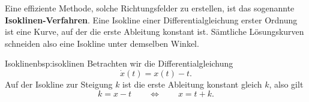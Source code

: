 Eine effiziente Methode, solche Richtungsfelder zu erstellen,
ist das sogenannte \textbf{Isoklinen-Verfahren}.
Eine Isokline einer Differentialgleichung erster Ordnung ist
eine Kurve, auf der die erste Ableitung konstant ist.
Sämtliche Lösungskurven schneiden also eine Isokline
unter demselben Winkel.

\begin{bsp}{Isoklinen}{bsp:isoklinen}
    Betrachten wir die Differentialgleichung
    \[
        \dot{x}(t)=x(t)-t.
    \]
    Auf der Isokline zur Steigung \(k\) ist die erste Ableitung
    konstant gleich \(k\), also gilt
    \[
        k=x-t
        \qquad\Longleftrightarrow\qquad
        x=t+k.
    \]


    \begin{center}
    \end{center}
\end{bsp}
